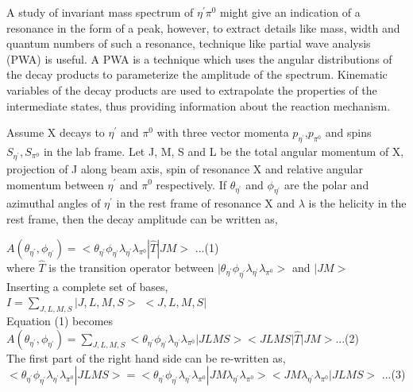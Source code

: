 \documentclass[11pt]{article}
\begin{document}
A study of invariant mass spectrum of $\eta^{'}\pi^{0}$ might give an indication of a resonance in the form of a peak, however, to extract details like mass, width and quantum numbers of such a resonance, technique like partial wave analysis (PWA) is useful. A PWA is a technique which uses the angular distributions of the decay products to parameterize the amplitude of the spectrum. Kinematic variables of the decay products are used to extrapolate the properties of the intermediate states, thus providing information about the reaction mechanism.

Assume X decays to $\eta^{'}$ and $\pi^{0}$   with three vector momenta $p_{\eta^{'} }$,$p_{\pi^{0}}$ and spins $S_{\eta^{' } },S_{\pi^{0}}$  in the lab frame. 
Let J, M, S and L be the total angular momentum of X, projection of J along beam axis, spin of resonance X and relative angular momentum between $\eta^{'}$ and $\pi^{0}$ respectively.
 If $\theta_{\eta^{'}}$ and $\phi_{\eta^{'}}$ are the polar and azimuthal angles of  $\eta^{'}$ in the rest frame of resonance X and $\lambda$ is the helicity in the rest frame, then the decay amplitude can be written as,
 
                 $A(\theta_{\eta^{'}},\phi_{\eta^{'}}) = <\theta_{\eta^{'}} \phi_{\eta^{'}}\lambda_{\eta^{'}} \lambda_{\pi^{0}}|\widehat{T}| JM>$ ...(1)\\
                 where $\widehat{T}$ is the transition operator between $|\theta_{\eta^{'}}\phi_{\eta^{'}}\lambda_{\eta^{'}}\lambda_{\pi^{0}}>$ and $| JM>$\\

Inserting a complete set of bases, \\
$I=\sum_{J,L,M,S}^ {}|J,L,M,S>$ $<J,L,M,S|$ \\
     
     Equation (1) becomes\\
$A(\theta_{\eta^{'}},\phi_{\eta^{'}}) = \sum_{J,L,M,S} {} <\theta_{\eta^{'}}\phi_{\eta^{'}}\lambda_{\eta^{'}}\lambda_{\pi^{0}} | JLMS> <JLMS | \widehat{T}|JM>$...(2) \\

     The first part of the right hand side can be re-written as,\\
     $<\theta_{\eta^{'}}\phi_{\eta^{'}}\lambda_{\eta^{'}}\lambda_{\pi^{0}} |JLMS> =<\theta_{\eta^{'}}\phi_{\eta^{'}}\lambda_{\eta^{'}}\lambda_{\pi^{0}} |JM\lambda_{\eta^{'}}\lambda_{\pi^{0}}> <JM\lambda_{\eta^{'}}\lambda_{\pi^{0}}|JLMS>$ ...(3)\\
     
\end{document}
